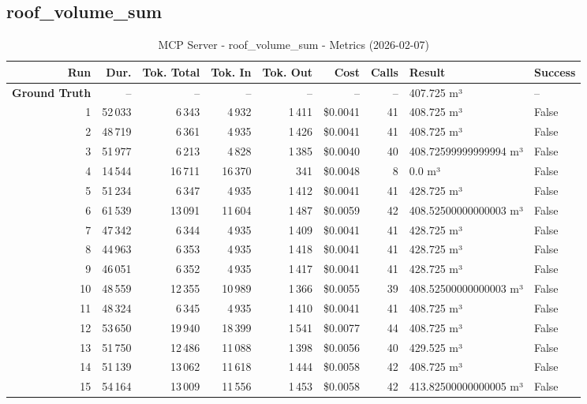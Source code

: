 \documentclass[a4paper,11pt]{article}
\begin{document}
\clearpage
\subsection{roof\_volume\_sum}

\begin{table}[ht]
\centering
\scriptsize
\caption{MCP Server - roof\_volume\_sum - Metrics (2026-02-07)}
\label{tab:mcp\_roof\_volume\_sum\_metrics\_2026-02-07}
\begin{tabular}{r r r r r r r p{3cm} l}
\hline
Run & Dur. & Tok. Total & Tok. In & Tok. Out & Cost & Calls & Result & Success \\
\hline
\textbf{Ground Truth} & -- & -- & -- & -- & -- & -- & 407.725 m³ & -- \\
\hline
1 & 52\,033 & 6\,343 & 4\,932 & 1\,411 & \$0.0041 & 41 & 408.725 m³ & False \\
2 & 48\,719 & 6\,361 & 4\,935 & 1\,426 & \$0.0041 & 41 & 408.725 m³ & False \\
3 & 51\,977 & 6\,213 & 4\,828 & 1\,385 & \$0.0040 & 40 & 408.72599999999994 m³ & False \\
4 & 14\,544 & 16\,711 & 16\,370 & 341 & \$0.0048 & 8 & 0.0 m³ & False \\
5 & 51\,234 & 6\,347 & 4\,935 & 1\,412 & \$0.0041 & 41 & 428.725 m³ & False \\
6 & 61\,539 & 13\,091 & 11\,604 & 1\,487 & \$0.0059 & 42 & 408.52500000000003 m³ & False \\
7 & 47\,342 & 6\,344 & 4\,935 & 1\,409 & \$0.0041 & 41 & 428.725 m³ & False \\
8 & 44\,963 & 6\,353 & 4\,935 & 1\,418 & \$0.0041 & 41 & 428.725 m³ & False \\
9 & 46\,051 & 6\,352 & 4\,935 & 1\,417 & \$0.0041 & 41 & 428.725 m³ & False \\
10 & 48\,559 & 12\,355 & 10\,989 & 1\,366 & \$0.0055 & 39 & 408.52500000000003 m³ & False \\
11 & 48\,324 & 6\,345 & 4\,935 & 1\,410 & \$0.0041 & 41 & 408.725 m³ & False \\
12 & 53\,650 & 19\,940 & 18\,399 & 1\,541 & \$0.0077 & 44 & 408.725 m³ & False \\
13 & 51\,750 & 12\,486 & 11\,088 & 1\,398 & \$0.0056 & 40 & 429.525 m³ & False \\
14 & 51\,139 & 13\,062 & 11\,618 & 1\,444 & \$0.0058 & 42 & 408.725 m³ & False \\
15 & 54\,164 & 13\,009 & 11\,556 & 1\,453 & \$0.0058 & 42 & 413.82500000000005 m³ & False \\

\end{tabular}
\end{table}
\end{document}
